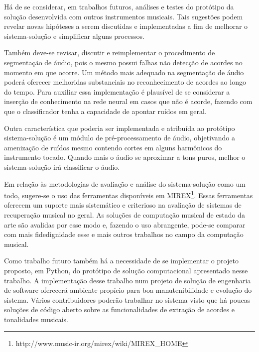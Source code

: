 Há de se considerar, em trabalhos futuros, análises e testes do protótipo da solução desenvolvida com outros instrumentos musicais. Tais sugestões podem revelar novas hipóteses a serem discutidas e implementadas a fim de melhorar o sistema-solução e simplificar alguns processos.

Também deve-se revisar, discutir e reimplementar o procedimento de segmentação de áudio, pois o mesmo possui falhas não detecção de acordes no momento em que ocorre. Um método mais adequado na segmentação de áudio poderá oferecer melhoridas substanciais no reconhecimento de acordes ao longo do tempo. Para auxiliar essa implementação é plausível de se considerar a inserção de conhecimento na rede neural em casos que não é acorde, fazendo com que o classificador tenha a capacidade de apontar ruídos em geral.

Outra característica que poderia ser implementada e atribuída ao protótipo sistema-solução é um módulo de pré-processamento de áudio, objetivando a amenização de ruídos mesmo contendo cortes em alguns harmônicos do instrumento tocado. Quando mais o áudio se aproximar a tons puros, melhor o sistema-solução irá classificar o áudio.

Em relação às metodologias de avaliação e análise do sistema-solução como um todo, sugere-se o uso das ferramentas disponíveis em MIREX\footnote{http://www.music-ir.org/mirex/wiki/MIREX\_HOME}. Essas ferramentas oferecem um suporte mais sistemático e criterioso na avaliação de sistemas de recuperação musical no geral. As soluções de computação musical de estado da arte são avalidas por esse modo e, fazendo o uso abrangente, pode-se comparar com mais fidedignidade esse e mais outros trabalhos no campo da computação musical.

Como trabalho futuro também há a necessidade de se implementar o projeto proposto, em Python, do protótipo de solução computacional apresentado nesse trabalho. A implementação desse trabalho num projeto de solução de engenharia de software oferecerá ambiente propício para boa manutenibilidade e evolução do sistema. Vários contribuidores poderão trabalhar no sistema visto que há poucas soluções de código aberto sobre as funcionalidades de extração de acordes e tonalidades musicais.